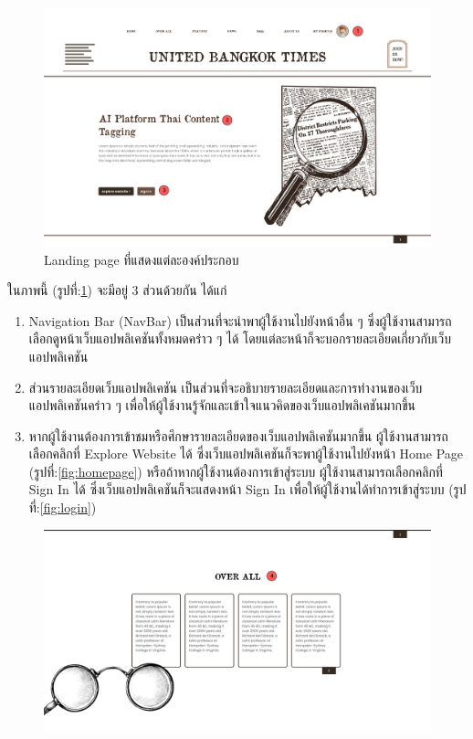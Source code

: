 \documentclass[12pt,oneside,openright,a4paper]{cpe-thai-project}
\begin{document}
\begin{itemize}
  \begin{figure}[!ht]\centering
    \includegraphics[width=15cm]{./img/project_ui/landing_page2.png} 
    \caption{Landing page ที่แสดงแต่ละองค์ประกอบ}\label{fig:landing_page_2} 
  \end{figure}
  \hspace*{1cm}ในภาพนี้ (รูปที่:\ref{fig:landing_page_2}) จะมีอยู่ 3 ส่วนด้วยกัน ได้แก่
  \begin{enumerate}
    \item Navigation Bar (NavBar) เป็นส่วนที่จะนำพาผู้ใช้งานไปยังหน้าอื่น ๆ 
          ซึ่งผู้ใช้งานสามารถเลือกดูหน้าเว็บแอปพลิเคชันทั้งหมดคร่าว ๆ ได้ โดยแต่ละหน้าก็จะบอกรายละเอียดเกี่ยวกับเว็บแอปพลิเคชัน
    \item ส่วนรายละเอียดเว็บแอปพลิเคชัน เป็นส่วนที่จะอธิบายรายละเอียดและการทำงานของเว็บแอปพลิเคชันคร่าว ๆ เพื่อให้ผู้ใช้งานรู้จักและเข้าใจแนวคิดของเว็บแอปพลิเคชันมากขึ้น
    \item หากผู้ใช้งานต้องการเข้าชมหรือศึกษารายละเอียดของเว็บแอปพลิเคชันมากขึ้น ผู้ใช้งานสามารถเลือกคลิกที่ Explore Website ได้ ซึ่งเว็บแอปพลิเคชันก็จะพาผู้ใช้งานไปยังหน้า Home Page (รูปที่:\ref{fig:homepage})
          หรือถ้าหากผู้ใช้งานต้องการเข้าสู่ระบบ ผู้ใช้งานสามารถเลือกคลิกที่ Sign In ได้ ซึ่งเว็บแอปพลิเคชันก็จะแสดงหน้า Sign In เพื่อให้ผู้ใช้งานได้ทำการเข้าสู่ระบบ (รูปที่:\ref{fig:login})
  \end{enumerate}
  \begin{figure}[!ht]\centering
    \includegraphics[width=14cm]{./img/project_ui/overall.png} 

\end{figure}
\end{itemize}
\end{document}
